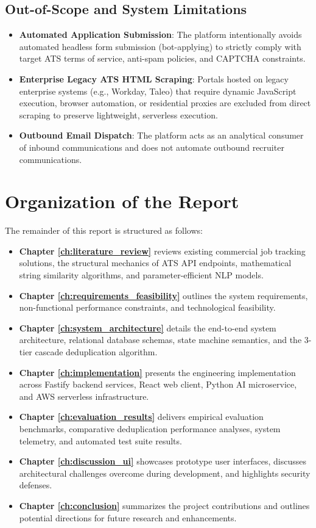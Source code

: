 \subsection{Out-of-Scope and System Limitations}
\begin{itemize}
    \item \textbf{Automated Application Submission}: The platform intentionally avoids automated headless form submission (bot-applying) to strictly comply with target ATS terms of service, anti-spam policies, and CAPTCHA constraints.
    \item \textbf{Enterprise Legacy ATS HTML Scraping}: Portals hosted on legacy enterprise systems (e.g., Workday, Taleo) that require dynamic JavaScript execution, browser automation, or residential proxies are excluded from direct scraping to preserve lightweight, serverless execution.
    \item \textbf{Outbound Email Dispatch}: The platform acts as an analytical consumer of inbound communications and does not automate outbound recruiter communications.
\end{itemize}

\section{Organization of the Report}
The remainder of this report is structured as follows:
\begin{itemize}
    \item \textbf{Chapter \ref{ch:literature_review}} reviews existing commercial job tracking solutions, the structural mechanics of ATS API endpoints, mathematical string similarity algorithms, and parameter-efficient NLP models.
    \item \textbf{Chapter \ref{ch:requirements_feasibility}} outlines the system requirements, non-functional performance constraints, and technological feasibility.
    \item \textbf{Chapter \ref{ch:system_architecture}} details the end-to-end system architecture, relational database schemas, state machine semantics, and the 3-tier cascade deduplication algorithm.
    \item \textbf{Chapter \ref{ch:implementation}} presents the engineering implementation across Fastify backend services, React web client, Python AI microservice, and AWS serverless infrastructure.
    \item \textbf{Chapter \ref{ch:evaluation_results}} delivers empirical evaluation benchmarks, comparative deduplication performance analyses, system telemetry, and automated test suite results.
    \item \textbf{Chapter \ref{ch:discussion_ui}} showcases prototype user interfaces, discusses architectural challenges overcome during development, and highlights security defenses.
    \item \textbf{Chapter \ref{ch:conclusion}} summarizes the project contributions and outlines potential directions for future research and enhancements.
\end{itemize}

